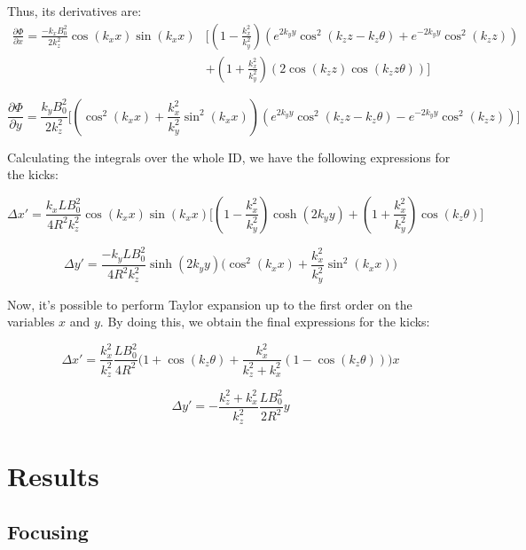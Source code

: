 \documentclass{article}
\begin{document}
Thus, its derivatives are:
\begin{equation}
\begin{split}
\frac{\partial\Phi}{\partial x} = \frac{-k_xB_0^2}{2k_z^2}\cos(k_xx)\sin(k_xx) & \bigg[\left(1-\frac{k_x^2}{k_y^2}\right)\left(e^{2k_yy}\cos^2(k_zz-k_z\theta) + e^{-2k_yy}\cos^2(k_zz)\right) \\
 & + \left(1+\frac{k_x^2}{k_y^2}\right)\left(2\cos(k_zz)\cos(k_zz\theta)\right)\bigg]
\end{split}
\end{equation}

\begin{equation}
\frac{\partial\Phi}{\partial y} = \frac{k_yB_0^2}{2k_z^2}\bigg[\left(\cos^2(k_xx)+\frac{k_x^2}{k_y^2}\sin^2(k_xx)\right)\left(e^{2k_yy}\cos^2(k_zz-k_z\theta) - e^{-2k_yy}\cos^2(k_zz)\right)\bigg]
\end{equation}
 
Calculating the integrals over the whole ID, we have the following expressions for the kicks:

\begin{equation}
\Delta x' = \frac{k_xLB_0^2}{4R^2k_z^2}\cos(k_xx)\sin(k_xx)\bigg[\left(1-\frac{k_x^2}{k_y^2}\right)\cosh(2k_yy) + \left(1+\frac{k_x^2}{k_y^2}\right)\cos(k_z\theta) \bigg]
\end{equation}


\begin{equation}
\Delta y' = \frac{-k_yLB_0^2}{4R^2k_z^2}\sinh(2k_yy)\bigg(\cos^2(k_xx)+\frac{k_x^2}{k_y^2}\sin^2(k_xx)\bigg)
\end{equation}


Now, it's possible to perform Taylor expansion up to the first order on the variables $x$ and $y$. By doing this, we obtain the final expressions for the kicks:

\begin{equation}
\Delta x' = \frac{k_x^2}{k_z^2}\frac{LB_0^2}{4R^2}\bigg(1+\cos(k_z\theta)+\frac{k_x^2}{k_z^2+k_x^2}\left(1-\cos(k_z\theta)\right)\bigg)x
\label{eq:kickx}
\end{equation}

\begin{equation}
\Delta y' = -\frac{k_z^2+k_x^2}{k_z^2}\frac{LB_0^2}{2R^2}y
\label{eq:kicky}
\end{equation}

\section{Results}
\subsection{Focusing}
\end{document}
